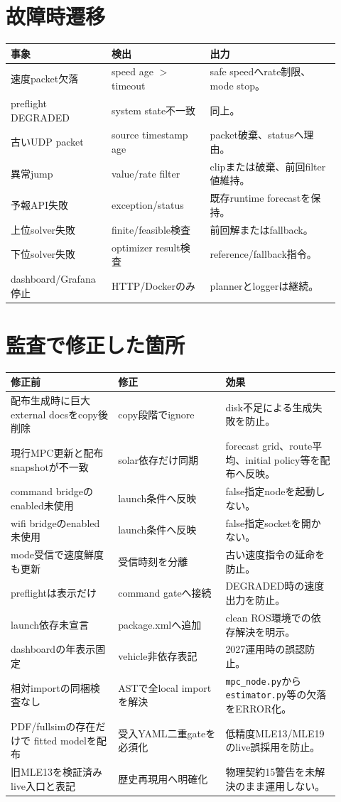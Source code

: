 \documentclass[a4paper,10pt,oneside]{book}
\begin{document}
\chapter{故障時遷移}
\begin{longtable}{p{0.27\linewidth}p{0.28\linewidth}p{0.37\linewidth}}
\toprule
事象 & 検出 & 出力\\\midrule
\endhead
速度packet欠落 & speed age $>$ timeout & safe speedへrate制限、mode stop。\\
preflight DEGRADED & system state不一致 & 同上。\\
古いUDP packet & source timestamp age & packet破棄、statusへ理由。\\
異常jump & value/rate filter & clipまたは破棄、前回filter値維持。\\
予報API失敗 & exception/status & 既存runtime forecastを保持。\\
上位solver失敗 & finite/feasible検査 & 前回解またはfallback。\\
下位solver失敗 & optimizer result検査 & reference/fallback指令。\\
dashboard/Grafana停止 & HTTP/Dockerのみ & plannerとloggerは継続。\\
\bottomrule
\end{longtable}

\chapter{監査で修正した箇所}
\begin{longtable}{p{0.30\linewidth}p{0.30\linewidth}p{0.32\linewidth}}
\toprule
修正前 & 修正 & 効果\\\midrule
\endhead
配布生成時に巨大external docsをcopy後削除 & copy段階でignore & disk不足による生成失敗を防止。\\
現行MPC更新と配布snapshotが不一致 & solar依存だけ同期 & forecast grid、route平均、initial policy等を配布へ反映。\\
command bridgeのenabled未使用 & launch条件へ反映 & false指定nodeを起動しない。\\
wifi bridgeのenabled未使用 & launch条件へ反映 & false指定socketを開かない。\\
mode受信で速度鮮度も更新 & 受信時刻を分離 & 古い速度指令の延命を防止。\\
preflightは表示だけ & command gateへ接続 & DEGRADED時の速度出力を防止。\\
launch依存未宣言 & package.xmlへ追加 & clean ROS環境での依存解決を明示。\\
dashboardの年表示固定 & vehicle非依存表記 & 2027運用時の誤認防止。\\
相対importの同梱検査なし & ASTで全local importを解決 & \texttt{mpc\_node.py}から\texttt{estimator.py}等の欠落をERROR化。\\
PDF/fullsimの存在だけで fitted modelを配布 & 受入YAML二重gateを必須化 & 低精度MLE13/MLE19のlive誤採用を防止。\\
旧MLE13を検証済みlive入口と表記 & 歴史再現用へ明確化 & 物理契約15警告を未解決のまま運用しない。\\
\bottomrule
\end{longtable}
\end{document}
